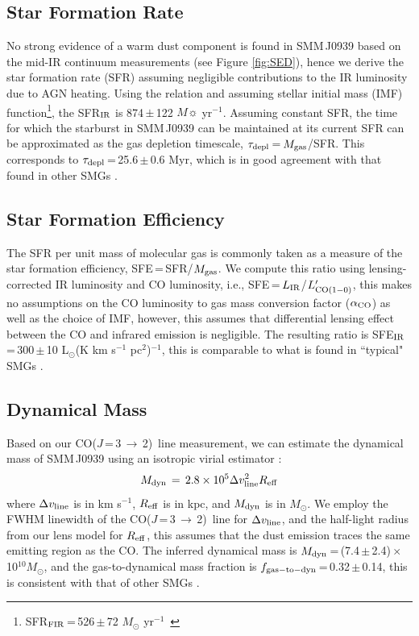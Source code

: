 \documentclass[twocolumn,apj,numberedappendix]{emulateapj}
\newcommand{\Msun}{\mbox{$M_{\odot}$}}
\newcommand{\Lsun}{\mbox{L$_{\odot}$}}
\newcommand{\CO}{\mbox{CO($J$\,=\,3\,$\rightarrow$\,2) }}
\newcommand{\Lp}{\mbox{$L^{\prime}_{\rm CO(1-0)}$}}
\newcommand{\LpU}{\mbox{K\,\,km\,\,s$^{-1}$\,\,pc$^2$}}
\newcommand{\eg}{{\sl e.g.,~}}
\newcommand{\pmOne}{\mbox{$^{-1}$}}
\begin{document}
\subsection{Star Formation Rate}
No strong evidence of a warm dust component is found in SMM\,J0939 based on the mid-IR continuum measurements (see Figure \ref{fig:SED}), hence we derive the star formation rate (SFR) assuming negligible contributions to the IR luminosity due to AGN heating. 
Using the \citet{Kennicutt98a} relation and assuming \citet{Chabrier03a}
stellar initial mass (IMF) function\footnote{SFR$_{\rm FIR}$\,=\,526\,$\pm$\,72 $M_
\odot$ yr\pmOne\ }, 
the SFR$_{\rm IR}$ is 874\,$\pm$\,122\,\,$M\sun$\,\,yr\pmOne.
Assuming constant SFR, the time for which the starburst in SMM\,J0939 can be maintained at its
current SFR can be approximated as the gas depletion timescale, $\tau_{\rm depl}$\,=\,$M_{\rm gas}$/SFR. 
This corresponds to $\tau_{\rm depl}$\,=\,25.6\,$\pm$\,0.6 Myr, which is in good agreement with that found in other SMGs \citep[\eg][]{Greve05a}. 

\subsection{Star Formation Efficiency}
The SFR per unit mass of molecular gas is commonly taken as a
measure of the star formation efficiency, SFE\,=\,SFR/$M_{\rm gas}$. We compute this ratio using lensing-corrected IR 
luminosity and CO luminosity, i.e., SFE\,=\,$L_{\rm IR}$/\Lp, this makes no assumptions on the CO luminosity to gas mass conversion factor ($\alpha_{\rm CO}$) as well as the 
choice of IMF, however, this assumes that differential lensing effect between the CO and infrared emission is negligible. 
The resulting ratio is SFE$_{\rm IR}$\,=\,300\,$\pm$\,10 \Lsun (\LpU)$^{-1}$, this is comparable
to what is found in ``typical" SMGs \citep{Riechers11c,Tacconi06a,Greve05a}.

\subsection{Dynamical Mass} 
Based on our \CO line measurement, we can estimate the dynamical mass of SMM\,J0939 using an isotropic virial estimator \citep[\eg][]{Engel10a}:
\begin{equation}
M_{\rm dyn}\,=\,2.8\times 10^5\Delta v_{\rm line}^ 2 R_{\rm eff}
\end{equation}
where $\Delta v_{\rm line}$ is in km\,\,s\pmOne, $R_{\rm eff}$ is in kpc, and $M_{\rm dyn}$ is in \Msun.
We employ the FWHM linewidth of the \CO line for $\Delta v_{\rm line}$,
and the half-light radius from our lens model for $R_{\rm eff}$, this assumes that the dust emission traces the same emitting region as the CO. The inferred dynamical mass is $M_{\rm dyn}$\,=\,(7.4\,$\pm$\,2.4)\,$\times$\,10$^{10}$\Msun, and the gas-to-dynamical mass fraction is $f_{\rm gas-to-dyn}$\,=\,0.32\,$\pm$\,0.14, this is consistent with that of other SMGs \citep{Tacconi06a}.
\end{document}
